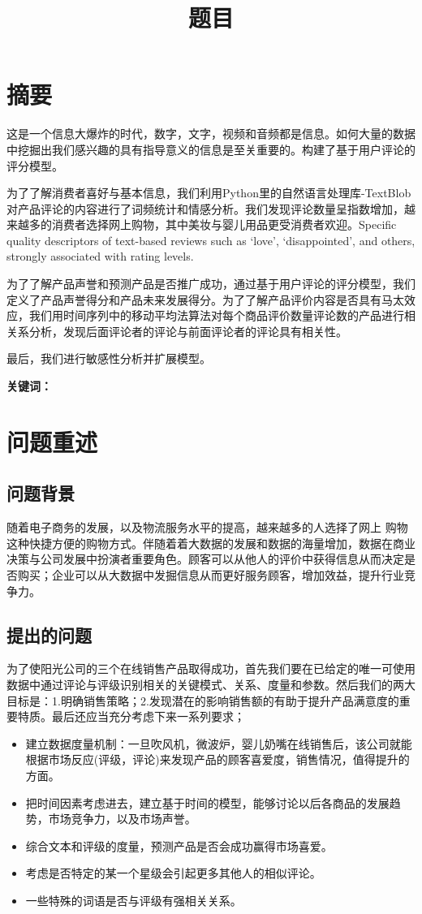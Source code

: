 \documentclass[UTF8]{article}
\title{题目}
\date{}
\begin{document}
\section*{摘\quad 要}
\begin{flushleft}
这是一个信息大爆炸的时代，数字，文字，视频和音频都是信息。如何大量的数据中挖掘出我们感兴趣的具有指导意义的信息是至关重要的。构建了基于用户评论的评分模型。

为了了解消费者喜好与基本信息，我们利用Python里的自然语言处理库-TextBlob对产品评论的内容进行了词频统计和情感分析。我们发现评论数量呈指数增加，越来越多的消费者选择网上购物，其中美妆与婴儿用品更受消费者欢迎。Specific quality descriptors of text-based reviews such as ‘love’, ‘disappointed’, and others, strongly associated with rating levels.

为了了解产品声誉和预测产品是否推广成功，通过基于用户评论的评分模型，我们定义了产品声誉得分和产品未来发展得分。为了了解产品评价内容是否具有马太效应，我们用时间序列中的移动平均法算法对每个商品评价数量评论数的产品进行相关系分析，发现后面评论者的评论与前面评论者的评论具有相关性。

最后，我们进行敏感性分析并扩展模型。

		
		
\textbf{关键词：} {}
\newpage
\end{flushleft}





\section{问题重述}
\subsection{问题背景}
随着电子商务的发展，以及物流服务水平的提高，越来越多的人选择了网上
购物这种快捷方便的购物方式。伴随着着大数据的发展和数据的海量增加，数据在商业决策与公司发展中扮演者重要角色。顾客可以从他人的评价中获得信息从而决定是否购买；企业可以从大数据中发掘信息从而更好服务顾客，增加效益，提升行业竞争力。
\subsection{提出的问题}
为了使阳光公司的三个在线销售产品取得成功，首先我们要在已给定的唯一可使用数据中通过评论与评级识别相关的关键模式、关系、度量和参数。然后我们的两大目标是：1.明确销售策略；2.发现潜在的影响销售额的有助于提升产品满意度的重要特质。最后还应当充分考虑下来一系列要求；
\begin{itemize}
	\item 建立数据度量机制：一旦吹风机，微波炉，婴儿奶嘴在线销售后，该公司就能根据市场反应(评级，评论)来发现产品的顾客喜爱度，销售情况，值得提升的方面。
	\item 把时间因素考虑进去，建立基于时间的模型，能够讨论以后各商品的发展趋势，市场竞争力，以及市场声誉。
	\item 综合文本和评级的度量，预测产品是否会成功赢得市场喜爱。
	\item 考虑是否特定的某一个星级会引起更多其他人的相似评论。
	\item 一些特殊的词语是否与评级有强相关关系。
\end{itemize}
\end{document}
